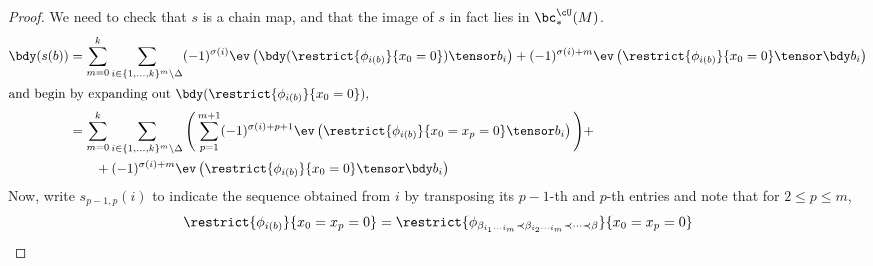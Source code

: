 \begin{proof}
We need to check that $s$ is a chain map, and that \todo{} the image of $s$ in fact lies in $\bc^{\cU}_*(M)$.
\begin{align*}
\bdy(s(b)) & = \sum_{m=0}^{k} \sum_{i \in \{1, \ldots, k\}^{m} \setminus \Delta} (-1)^{\sigma(i)} \ev\left(\bdy(\restrict{\phi_{i(b)}}{x_0 = 0})\tensor b_i\right) + (-1)^{\sigma(i) + m} \ev\left(\restrict{\phi_{i(b)}}{x_0 = 0} \tensor \bdy b_i\right) \\
\intertext{and begin by expanding out $\bdy(\restrict{\phi_{i(b)}}{x_0 = 0})$,}
	& = \sum_{m=0}^{k} \sum_{i \in \{1, \ldots, k\}^{m} \setminus \Delta} \Bigg(\sum_{p=1}^{m+1} (-1)^{\sigma(i)+p+1} \ev\left(\restrict{\phi_{i(b)}}{x_0 = x_p = 0}\tensor b_i\right) \Bigg) + \\
	& \qquad + (-1)^{\sigma(i) + m} \ev\left(\restrict{\phi_{i(b)}}{x_0 = 0} \tensor \bdy b_i\right)
\end{align*}
Now, write $s_{p-1,p}(i)$ to indicate the sequence obtained from $i$ by transposing its $p-1$-th and $p$-th entries and note that for $2 \leq p \leq m$,
\begin{align*}
\restrict{\phi_{i(b)}}{x_0=x_p=0} & = \restrict{\phi_{\beta_{i_1\cdots i_m} \prec \beta_{i_2 \cdots i_m} \prec \cdots \prec \beta}}{x_0=x_p=0} \\

\end{align*}
\end{proof}
